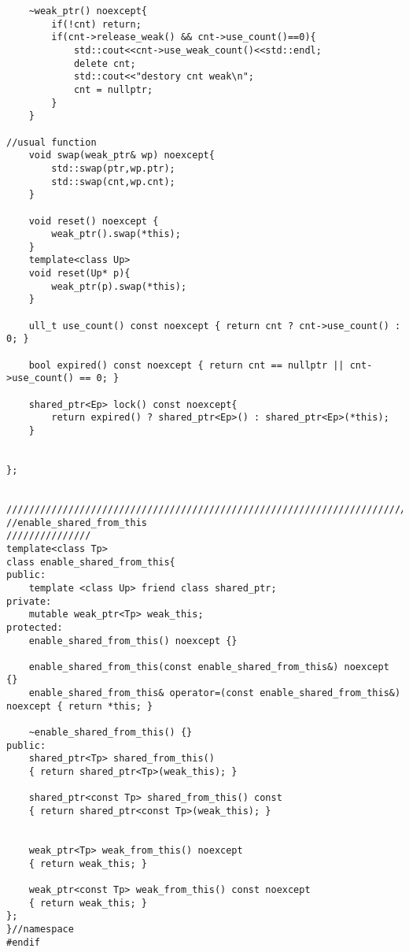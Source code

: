 \begin{lstlisting}
	~weak_ptr() noexcept{
		if(!cnt) return;
		if(cnt->release_weak() && cnt->use_count()==0){
			std::cout<<cnt->use_weak_count()<<std::endl;
			delete cnt;
			std::cout<<"destory cnt weak\n";
			cnt = nullptr;
		}
	}

//usual function
	void swap(weak_ptr& wp) noexcept{
		std::swap(ptr,wp.ptr);
		std::swap(cnt,wp.cnt);
	}

	void reset() noexcept {
		weak_ptr().swap(*this);
	}
	template<class Up>
	void reset(Up* p){
		weak_ptr(p).swap(*this);
	}

	ull_t use_count() const noexcept { return cnt ? cnt->use_count() : 0; }

	bool expired() const noexcept { return cnt == nullptr || cnt->use_count() == 0; }

	shared_ptr<Ep> lock() const noexcept{
		return expired() ? shared_ptr<Ep>() : shared_ptr<Ep>(*this);
	}


};


//////////////////////////////////////////////////////////////////////////
//enable_shared_from_this
///////////////
template<class Tp>
class enable_shared_from_this{   
public:
	template <class Up> friend class shared_ptr;
private:
	mutable weak_ptr<Tp> weak_this;
protected:
	enable_shared_from_this() noexcept {}

	enable_shared_from_this(const enable_shared_from_this&) noexcept {}
	enable_shared_from_this& operator=(const enable_shared_from_this&) noexcept { return *this; }

	~enable_shared_from_this() {}
public:
	shared_ptr<Tp> shared_from_this() 
	{ return shared_ptr<Tp>(weak_this); }

	shared_ptr<const Tp> shared_from_this() const 
	{ return shared_ptr<const Tp>(weak_this); }


	weak_ptr<Tp> weak_from_this() noexcept
	{ return weak_this; }

	weak_ptr<const Tp> weak_from_this() const noexcept
	{ return weak_this; }
};
}//namespace
#endif
\end{lstlisting}